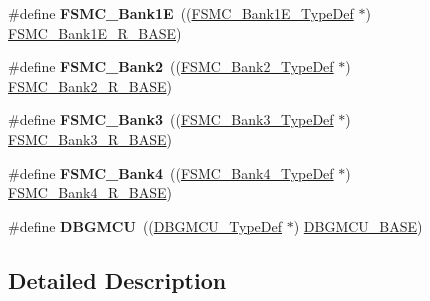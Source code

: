 \begin{DoxyCompactItemize}
\item 
\hypertarget{group___peripheral__declaration_ga422986101f42a8811ae89ac69deb2759}{\#define {\bfseries F\-S\-M\-C\-\_\-\-Bank1\-E}~((\hyperlink{struct_f_s_m_c___bank1_e___type_def}{F\-S\-M\-C\-\_\-\-Bank1\-E\-\_\-\-Type\-Def} $\ast$) \hyperlink{group___peripheral__memory__map_gaea182589c84aee30b7f735474d8774e2}{F\-S\-M\-C\-\_\-\-Bank1\-E\-\_\-\-R\-\_\-\-B\-A\-S\-E})}\label{group___peripheral__declaration_ga422986101f42a8811ae89ac69deb2759}

\item 
\hypertarget{group___peripheral__declaration_gabb3dfb5e88694aa2983ecabd33a55e0a}{\#define {\bfseries F\-S\-M\-C\-\_\-\-Bank2}~((\hyperlink{struct_f_s_m_c___bank2___type_def}{F\-S\-M\-C\-\_\-\-Bank2\-\_\-\-Type\-Def} $\ast$) \hyperlink{group___peripheral__memory__map_ga3cb46d62f4f6458e186a5a4c753e4918}{F\-S\-M\-C\-\_\-\-Bank2\-\_\-\-R\-\_\-\-B\-A\-S\-E})}\label{group___peripheral__declaration_gabb3dfb5e88694aa2983ecabd33a55e0a}

\item 
\hypertarget{group___peripheral__declaration_ga411eedc00b5b2b22b494004d4f41b736}{\#define {\bfseries F\-S\-M\-C\-\_\-\-Bank3}~((\hyperlink{struct_f_s_m_c___bank3___type_def}{F\-S\-M\-C\-\_\-\-Bank3\-\_\-\-Type\-Def} $\ast$) \hyperlink{group___peripheral__memory__map_gacf056152c9e5aefcc67db78d1302c0d7}{F\-S\-M\-C\-\_\-\-Bank3\-\_\-\-R\-\_\-\-B\-A\-S\-E})}\label{group___peripheral__declaration_ga411eedc00b5b2b22b494004d4f41b736}

\item 
\hypertarget{group___peripheral__declaration_ga5aa00e4ac522693c6a21bc23ef5a96df}{\#define {\bfseries F\-S\-M\-C\-\_\-\-Bank4}~((\hyperlink{struct_f_s_m_c___bank4___type_def}{F\-S\-M\-C\-\_\-\-Bank4\-\_\-\-Type\-Def} $\ast$) \hyperlink{group___peripheral__memory__map_gaf9e5417133160b0bdd0498d982acec19}{F\-S\-M\-C\-\_\-\-Bank4\-\_\-\-R\-\_\-\-B\-A\-S\-E})}\label{group___peripheral__declaration_ga5aa00e4ac522693c6a21bc23ef5a96df}

\item 
\hypertarget{group___peripheral__declaration_ga92ec6d9ec2251fda7d4ce09748cd74b4}{\#define {\bfseries D\-B\-G\-M\-C\-U}~((\hyperlink{struct_d_b_g_m_c_u___type_def}{D\-B\-G\-M\-C\-U\-\_\-\-Type\-Def} $\ast$) \hyperlink{group___peripheral__memory__map_ga4adaf4fd82ccc3a538f1f27a70cdbbef}{D\-B\-G\-M\-C\-U\-\_\-\-B\-A\-S\-E})}\label{group___peripheral__declaration_ga92ec6d9ec2251fda7d4ce09748cd74b4}

\end{DoxyCompactItemize}


\subsection{Detailed Description}
